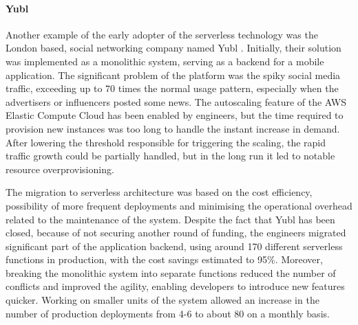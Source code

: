 
\paragraph{Yubl} \label{chapter:serverless-suitability-yubl}

Another example of the early adopter of the serverless technology was the London based, social networking company named Yubl \cite{ServerlessComputingEconomicAndArchitecturalImpact}.
Initially, their solution was implemented as a monolithic system, serving as a backend for a mobile application.
The significant problem of the platform was the spiky social media traffic, exceeding up to 70 times the normal usage pattern, especially when the advertisers or influencers posted some news.
The autoscaling feature of the AWS Elastic Compute Cloud has been enabled by engineers, but the time required to provision new instances was too long to handle the instant increase in demand.
After lowering the threshold responsible for triggering the scaling, the rapid traffic growth could be partially handled, but in the long run it led to notable resource overprovisioning.

The migration to serverless architecture was based on the cost efficiency, possibility of more frequent deployments and minimising the operational overhead related to the maintenance of the system.
Despite the fact that Yubl has been closed, because of not securing another round of funding, the engineers migrated significant part of the application backend, using around 170 different serverless functions in production, with the cost savings estimated to 95\%.
Moreover, breaking the monolithic system into separate functions reduced the number of conflicts and improved the agility, enabling developers to introduce new features quicker.
Working on smaller units of the system allowed an increase in the number of production deployments from 4-6 to about 80 on a monthly basis.


